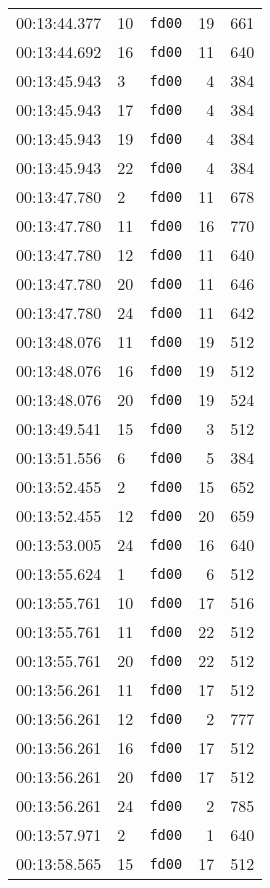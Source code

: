 \documentclass{article}
\begin{document}
\begin{longtable}{lllrr}
00:13:44.377 & 10 & \texttt{fd00} & 19 & 661 \\
00:13:44.692 & 16 & \texttt{fd00} & 11 & 640 \\
00:13:45.943 & 3 & \texttt{fd00} & 4 & 384 \\
00:13:45.943 & 17 & \texttt{fd00} & 4 & 384 \\
00:13:45.943 & 19 & \texttt{fd00} & 4 & 384 \\
00:13:45.943 & 22 & \texttt{fd00} & 4 & 384 \\
00:13:47.780 & 2 & \texttt{fd00} & 11 & 678 \\
00:13:47.780 & 11 & \texttt{fd00} & 16 & 770 \\
00:13:47.780 & 12 & \texttt{fd00} & 11 & 640 \\
00:13:47.780 & 20 & \texttt{fd00} & 11 & 646 \\
00:13:47.780 & 24 & \texttt{fd00} & 11 & 642 \\
00:13:48.076 & 11 & \texttt{fd00} & 19 & 512 \\
00:13:48.076 & 16 & \texttt{fd00} & 19 & 512 \\
00:13:48.076 & 20 & \texttt{fd00} & 19 & 524 \\
00:13:49.541 & 15 & \texttt{fd00} & 3 & 512 \\
00:13:51.556 & 6 & \texttt{fd00} & 5 & 384 \\
00:13:52.455 & 2 & \texttt{fd00} & 15 & 652 \\
00:13:52.455 & 12 & \texttt{fd00} & 20 & 659 \\
00:13:53.005 & 24 & \texttt{fd00} & 16 & 640 \\
00:13:55.624 & 1 & \texttt{fd00} & 6 & 512 \\
00:13:55.761 & 10 & \texttt{fd00} & 17 & 516 \\
00:13:55.761 & 11 & \texttt{fd00} & 22 & 512 \\
00:13:55.761 & 20 & \texttt{fd00} & 22 & 512 \\
00:13:56.261 & 11 & \texttt{fd00} & 17 & 512 \\
00:13:56.261 & 12 & \texttt{fd00} & 2 & 777 \\
00:13:56.261 & 16 & \texttt{fd00} & 17 & 512 \\
00:13:56.261 & 20 & \texttt{fd00} & 17 & 512 \\
00:13:56.261 & 24 & \texttt{fd00} & 2 & 785 \\
00:13:57.971 & 2 & \texttt{fd00} & 1 & 640 \\
00:13:58.565 & 15 & \texttt{fd00} & 17 & 512 \\

\end{longtable}
\end{document}
